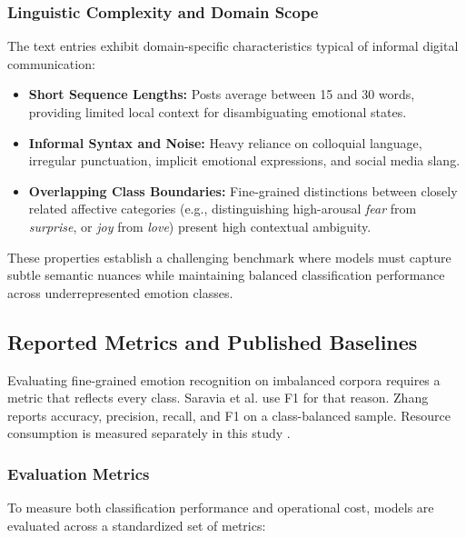 \documentclass[conference]{IEEEtran}
\begin{document}
\subsubsection{Linguistic Complexity and Domain Scope}
The text entries exhibit domain-specific characteristics typical of informal digital communication:
\begin{itemize}
    \item \textbf{Short Sequence Lengths:} Posts average between 15 and 30 words, providing limited local context for disambiguating emotional states.
    \item \textbf{Informal Syntax and Noise:} Heavy reliance on colloquial language, irregular punctuation, implicit emotional expressions, and social media slang.
    \item \textbf{Overlapping Class Boundaries:} Fine-grained distinctions between closely related affective categories (e.g., distinguishing high-arousal \textit{fear} from \textit{surprise}, or \textit{joy} from \textit{love}) present high contextual ambiguity.
\end{itemize}

These properties establish a challenging benchmark where models must capture subtle semantic nuances while maintaining balanced 
classification performance across underrepresented emotion classes.

\subsection{Reported Metrics and Published Baselines}

Evaluating fine-grained emotion recognition on imbalanced corpora requires a metric that reflects every class. Saravia et al. \cite{saravia2018carer} use F1 for that reason. Zhang \cite{zhang2024comparative} reports accuracy, precision, recall, and F1 on a class-balanced sample. Resource consumption is measured separately in this study \cite{nwaiwu2025peft}.

\subsubsection{Evaluation Metrics}
To measure both classification performance and operational cost, models are evaluated across a standardized set of metrics:
\end{document}

